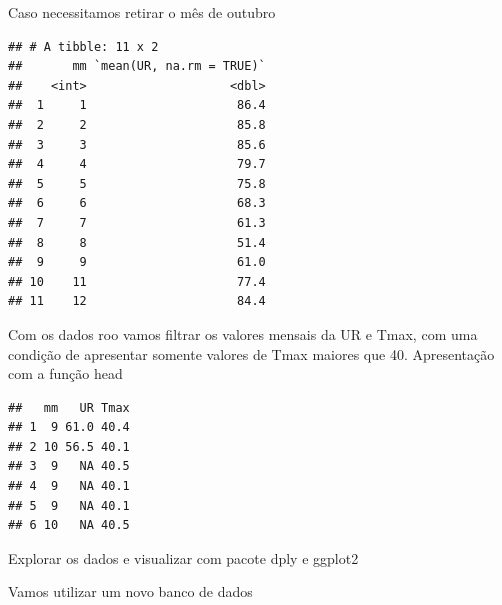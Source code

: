 \documentclass[
]{book}
\newenvironment{Shaded}{\begin{snugshade}}{\end{snugshade}}
\newcommand{\DataTypeTok}[1]{\textcolor[rgb]{0.13,0.29,0.53}{#1}}
\newcommand{\DecValTok}[1]{\textcolor[rgb]{0.00,0.00,0.81}{#1}}
\newcommand{\KeywordTok}[1]{\textcolor[rgb]{0.13,0.29,0.53}{\textbf{#1}}}
\newcommand{\NormalTok}[1]{#1}
\newcommand{\OperatorTok}[1]{\textcolor[rgb]{0.81,0.36,0.00}{\textbf{#1}}}
\newcommand{\OtherTok}[1]{\textcolor[rgb]{0.56,0.35,0.01}{#1}}
\newcommand{\StringTok}[1]{\textcolor[rgb]{0.31,0.60,0.02}{#1}}
\begin{document}
Caso necessitamos retirar o mês de outubro

\begin{Shaded}
\end{Shaded}

\begin{verbatim}
## # A tibble: 11 x 2
##       mm `mean(UR, na.rm = TRUE)`
##    <int>                    <dbl>
##  1     1                     86.4
##  2     2                     85.8
##  3     3                     85.6
##  4     4                     79.7
##  5     5                     75.8
##  6     6                     68.3
##  7     7                     61.3
##  8     8                     51.4
##  9     9                     61.0
## 10    11                     77.4
## 11    12                     84.4
\end{verbatim}

Com os dados roo vamos filtrar os valores mensais da UR e Tmax, com uma condição de apresentar somente valores de Tmax maiores que 40. Apresentação com a função head

\begin{Shaded}
\end{Shaded}

\begin{verbatim}
##   mm   UR Tmax
## 1  9 61.0 40.4
## 2 10 56.5 40.1
## 3  9   NA 40.5
## 4  9   NA 40.1
## 5  9   NA 40.1
## 6 10   NA 40.5
\end{verbatim}

Explorar os dados e visualizar com pacote dply e ggplot2

Vamos utilizar um novo banco de dados
\end{document}
